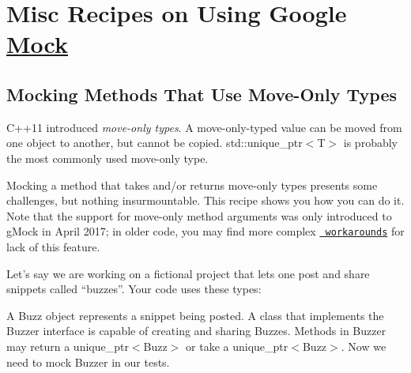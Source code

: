 \section*{Misc Recipes on Using Google \mbox{\hyperlink{classMock}{Mock}}}

\subsection*{Mocking Methods That Use Move-\/\+Only Types}

C++11 introduced {\itshape move-\/only types}. A move-\/only-\/typed value can be moved from one object to another, but cannot be copied. {\ttfamily std\+::unique\+\_\+ptr$<$T$>$} is probably the most commonly used move-\/only type.

Mocking a method that takes and/or returns move-\/only types presents some challenges, but nothing insurmountable. This recipe shows you how you can do it. Note that the support for move-\/only method arguments was only introduced to g\+Mock in April 2017; in older code, you may find more complex \href{\#LegacyMoveOnly}{\texttt{ workarounds}} for lack of this feature.

Let’s say we are working on a fictional project that lets one post and share snippets called “buzzes”. Your code uses these types\+:


\begin{DoxyCode}{0}
\DoxyCodeLine{}
\DoxyCodeLine{ \textcolor{keyword}{public}:}
\DoxyCodeLine{\};}
\DoxyCodeLine{}
\DoxyCodeLine{ \textcolor{keyword}{public}:}
\DoxyCodeLine{\};}
\end{DoxyCode}


A {\ttfamily Buzz} object represents a snippet being posted. A class that implements the {\ttfamily Buzzer} interface is capable of creating and sharing {\ttfamily Buzz}es. Methods in {\ttfamily Buzzer} may return a {\ttfamily unique\+\_\+ptr$<$Buzz$>$} or take a {\ttfamily unique\+\_\+ptr$<$Buzz$>$}. Now we need to mock {\ttfamily Buzzer} in our tests.

